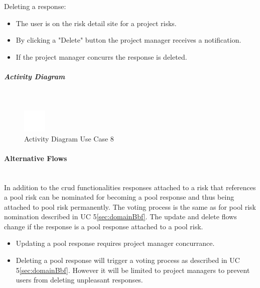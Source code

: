 \noindent
Deleting a response:
\begin{itemize}
	\vspace{-3mm}
	\setlength\itemsep{-1em}
	\item The user is on the risk detail site for a project risks.
	\item By clicking a "Delete" button the project manager receives a notification.
	\item If the project manager concurrs the response is deleted.
\end{itemize}


\subparagraph{Activity Diagram}\mbox{}\\
\begin{figure}[h]
	\centering
	\includegraphics[width=0.1\textwidth]{Content/Domain/placeholder.png}
	\caption{Activity Diagram Use Case 8}
	\label{fig:label88}
\end{figure}

\paragraph*{Alternative Flows}\mbox{}\\
In addition to the crud functionalities responses attached to a risk that references a pool risk can be nominated for becoming a pool response and thus being attached to pool risk permanently. The voting process is the same as for pool risk nomination described in UC 5\ref{sec:domainBbf}.
The update and delete flows change if the response is a pool response attached to a pool risk.
\begin{itemize}
	\vspace{-3mm}
	\setlength\itemsep{-1em}
	\item Updating a pool response requires project manager concurrance.
	\item Deleting a pool response will trigger a voting process as described in UC 5\ref{sec:domainBbf}. However it will be limited to project managers to prevent users from deleting unpleasant responses.
\end{itemize}


